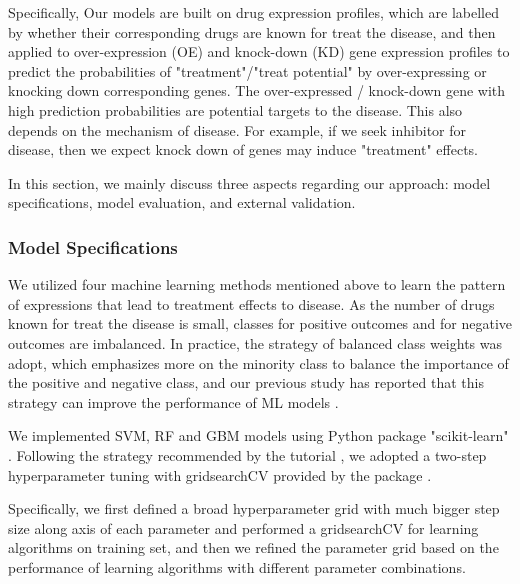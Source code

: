     Specifically, Our models are built on drug expression profiles, which are labelled by whether their corresponding drugs are known for treat the disease, and then applied to over-expression (OE) and knock-down (KD) gene expression profiles to predict the probabilities of "treatment"/"treat potential" by over-expressing or knocking down corresponding genes. The over-expressed / knock-down gene with high prediction probabilities are potential targets to the disease. This also depends on the mechanism of disease. For example, if we seek inhibitor for disease, then we expect knock down of genes may induce "treatment" effects.

    In this section, we mainly discuss three aspects regarding our approach: model specifications, model evaluation, and external validation.

    \subsubsection{Model Specifications}
      We utilized four machine learning methods mentioned above to learn the pattern of expressions that lead to treatment effects to disease. As the number of drugs known for treat the disease is small, classes for positive outcomes and for negative outcomes are imbalanced. In practice, the strategy of balanced class weights was adopt, which emphasizes more on the minority class to balance the importance of the positive and negative class,  and our previous study has reported that this strategy can improve the performance of ML models \cite{zhao2018drug}. 
      
      We implemented SVM, RF and GBM models using Python package "scikit-learn" \cite{pedregosa2011scikit}. Following the strategy recommended by the tutorial \cite{hsu2003practical}, we adopted a two-step hyperparameter tuning with gridsearchCV provided by the package \cite{pedregosa2011scikit}. 
      
      Specifically, we first defined a broad hyperparameter grid with much bigger step size along axis of each parameter and performed a gridsearchCV for learning algorithms on training set, and then we refined the parameter grid based on the performance of learning algorithms with different parameter combinations. 
   
